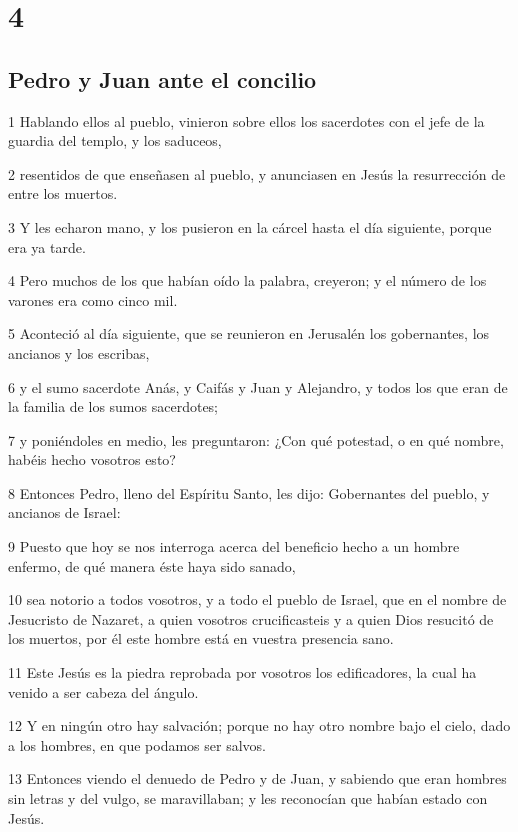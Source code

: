 \chapter{4}

\section*{Pedro y Juan ante el concilio}

\par 1 Hablando ellos al pueblo, vinieron sobre ellos los sacerdotes con el jefe de la guardia del templo, y los saduceos,
\par 2 resentidos de que enseñasen al pueblo, y anunciasen en Jesús la resurrección de entre los muertos.
\par 3 Y les echaron mano, y los pusieron en la cárcel hasta el día siguiente, porque era ya tarde.
\par 4 Pero muchos de los que habían oído la palabra, creyeron; y el número de los varones era como cinco mil.
\par 5 Aconteció al día siguiente, que se reunieron en Jerusalén los gobernantes, los ancianos y los escribas,
\par 6 y el sumo sacerdote Anás, y Caifás y Juan y Alejandro, y todos los que eran de la familia de los sumos sacerdotes;
\par 7 y poniéndoles en medio, les preguntaron: ¿Con qué potestad, o en qué nombre, habéis hecho vosotros esto?
\par 8 Entonces Pedro, lleno del Espíritu Santo, les dijo: Gobernantes del pueblo, y ancianos de Israel:
\par 9 Puesto que hoy se nos interroga acerca del beneficio hecho a un hombre enfermo, de qué manera éste haya sido sanado,
\par 10 sea notorio a todos vosotros, y a todo el pueblo de Israel, que en el nombre de Jesucristo de Nazaret, a quien vosotros crucificasteis y a quien Dios resucitó de los muertos, por él este hombre está en vuestra presencia sano.
\par 11 Este Jesús es la piedra reprobada por vosotros los edificadores, la cual ha venido a ser cabeza del ángulo.
\par 12 Y en ningún otro hay salvación; porque no hay otro nombre bajo el cielo, dado a los hombres, en que podamos ser salvos.
\par 13 Entonces viendo el denuedo de Pedro y de Juan, y sabiendo que eran hombres sin letras y del vulgo, se maravillaban; y les reconocían que habían estado con Jesús.
